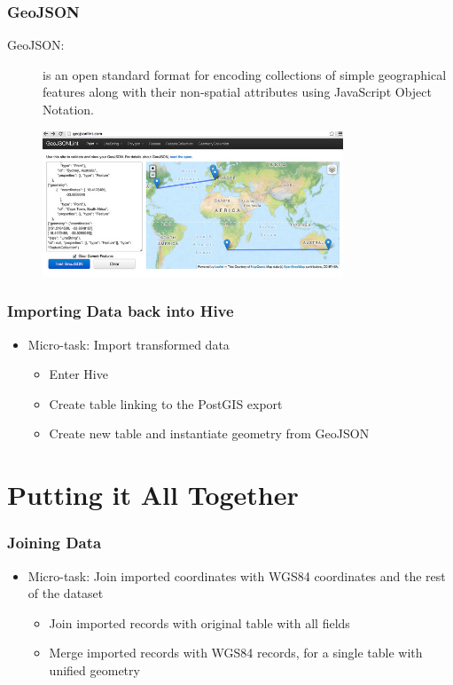 \documentclass[hyperref={pdfpagelabels=true}]{beamer}
\begin{document}
\begin{frame}
\frametitle{GeoJSON}
\begin{description}
  \item [GeoJSON:] is an open standard format for encoding collections of simple geographical features along with their non-spatial attributes using JavaScript Object Notation.
\end{description}
      \begin{figure}  
	\includegraphics[width=0.8\textwidth]{geojson2.jpg}
       \end{figure}  
\end{frame}



\begin{frame}
\frametitle{Importing Data back into Hive}
\begin{itemize}
  \item<1->Micro-task: Import transformed data
  \begin{itemize}
    \item<2->Enter Hive
    \item<3->Create table linking to the PostGIS export    
    \item<4->Create new table and instantiate geometry from GeoJSON
  \end{itemize}
\end{itemize}
\end{frame}


\section{Putting it All Together} 
\begin{frame}
\frametitle{Joining Data}
\begin{itemize}
  \item<1->Micro-task: Join imported coordinates with WGS84 coordinates and the rest of the dataset
  \begin{itemize}
    \item<2->Join imported records with original table with all fields
    \item<3->Merge imported records with WGS84 records, for a single table with unified geometry
  \end{itemize}
\end{itemize}
\end{frame}
\end{document}
